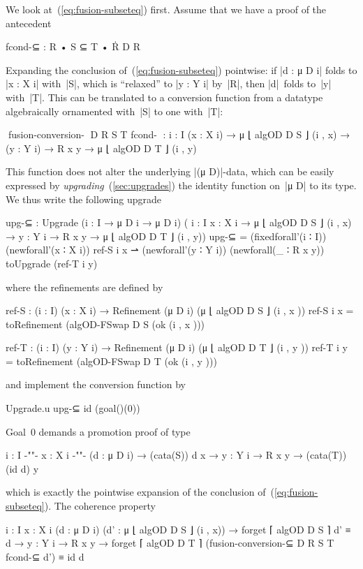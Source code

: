 We look at~(\ref{eq:fusion-subseteq}) first.
Assume that we have a proof of the antecedent
\begin{code}
fcond-⊆ : R • S ⊆ T • Ṙ D R
\end{code}
Expanding the conclusion of~(\ref{eq:fusion-subseteq}) pointwise: if |d : μ D i| folds to |x : X i| with~|S|, which is ``relaxed'' to |y : Y i| by~|R|, then |d|~folds to~|y| with~|T|.
This can be translated to a conversion function from a datatype algebraically ornamented with~|S| to one with~|T|:
\begin{code}
^^^fusion-conversion-⊆ D R S T fcond-⊆ :
  {i : I} (x : X i) → μ ⌊ algOD D S ⌋ (i , x) →
  (y : Y i) → R x y → μ ⌊ algOD D T ⌋ (i , y)
\end{code}
This function does not alter the underlying |(μ D)|-data, which can be easily expressed by \emph{upgrading}~(\autoref{sec:upgrades}) the identity function on~|μ D| to its type.
We thus write the following upgrade
\begin{code}
upg-⊆ : Upgrade  ({i : I} → μ D i → μ D i)
                 (  {i : I} {x : X i} → μ ⌊ algOD D S ⌋ (i , x) →
                    {y : Y i} → R x y  → μ ⌊ algOD D T ⌋ (i , y))
upg-⊆ =  (fixedforall'(i ∶ I)) (newforall'(x ∶ X i)) ref-S i x ⇀ 
         (newforall'(y ∶ Y i)) (newforall(_ ∶ R x y)) toUpgrade (ref-T i y)
\end{code}
where the refinements are defined by
\begin{code}
ref-S  : (i : I) (x : X  i) → Refinement (μ D i) (μ ⌊ algOD D S  ⌋ (i , x  ))
ref-S   i x  = toRefinement (algOD-FSwap D S  (ok (i , x  )))

ref-T  : (i : I) (y : Y  i) → Refinement (μ D i) (μ ⌊ algOD D T  ⌋ (i , y  ))
ref-T   i y  = toRefinement (algOD-FSwap D T  (ok (i , y  )))
\end{code}
and implement the conversion function by
\begin{code}
Upgrade.u upg-⊆ id (goal()(0))
\end{code}
Goal~0 demands a promotion proof of type
\begin{code}
{i : I} {-"\kern-1pt"-} {x : X i} {-"\kern-1pt"-} (d : μ D i) → (cata(S)) d x → {y : Y i} → R x y → (cata(T)) (id d) y
\end{code}
which is exactly the pointwise expansion of the conclusion of~(\ref{eq:fusion-subseteq}).
The coherence property
\begin{code}
{i : I} {x : X i} (d : μ D i) (d' : μ ⌊ algOD D S ⌋ (i , x)) →
  forget ⌈ algOD D S ⌉ d' ≡ d →
{y : Y i} → R x y →
  forget ⌈ algOD D T ⌉ (fusion-conversion-⊆ D R S T fcond-⊆ d') ≡ id d
\end{code}
